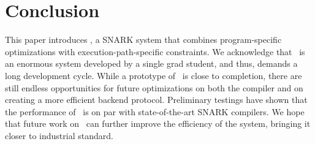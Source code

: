 \section{Conclusion}
This paper introduces \CoBBl, a SNARK system that combines program-specific optimizations with execution-path-specific constraints. We acknowledge that \CoBBl~is an enormous system developed by a single grad student, and thus, demands a long development cycle. While a prototype of \CoBBl~is close to completion, there are still endless opportunities for future optimizations on both the compiler and on creating a more efficient backend protocol. Preliminary testings have shown that the performance of \CoBBl~is on par with state-of-the-art SNARK compilers. We hope that future work on \CoBBl~can further improve the efficiency of the system, bringing it closer to industrial standard.
